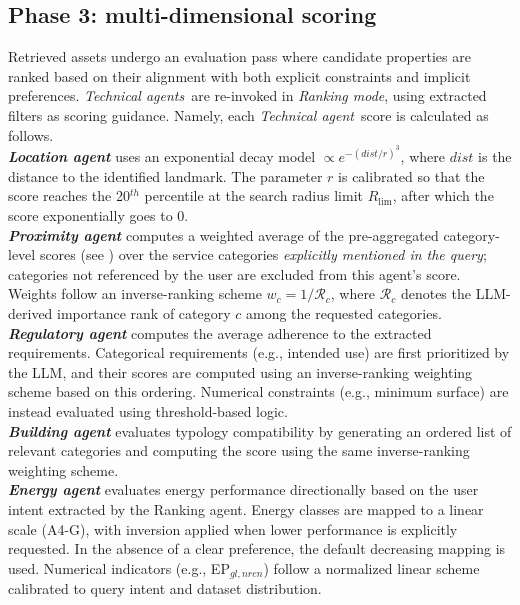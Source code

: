 \documentclass[runningheads,orivec]{llncs}
\newcommand{\technicalagent}{\textit{Technical agent}}
\newcommand{\technicalagents}{\textit{Technical agents}}
\newcommand{\locationagent}{\textit{Location agent}}
\newcommand{\energyagent}{\textit{Energy agent}}
\newcommand{\proximityagent}{\textit{Proximity agent}}
\newcommand{\regulatoryagent}{\textit{Regulatory agent}}
\newcommand{\buildingagent}{\textit{Building agent}}
\newcommand{\rankingmode}{\textit{Ranking mode}}
\begin{document}
\subsection{Phase 3: multi-dimensional scoring}
\label{sec:methods_phase3}
Retrieved assets undergo an evaluation pass where candidate properties are ranked based on their alignment with both explicit constraints and implicit preferences.
\technicalagents\ are re-invoked in \rankingmode, using extracted filters as scoring guidance.
Namely, each \technicalagent\ score is calculated as follows.
\\
\textbf{\locationagent} uses an exponential decay model $\propto e^{-(dist/r)^3}$, where $dist$ is the distance to the identified landmark. The parameter $r$ is calibrated so that the score reaches the 20$^{th}$ percentile at the search radius limit $R_\text{lim}$, after which the score exponentially goes to 0.
\\
\textbf{\proximityagent} computes a weighted average of the pre-aggregated 
category-level scores (see ) over the service categories 
\emph{explicitly mentioned in the query}; categories not referenced by the 
user are excluded from this agent's score. Weights follow an inverse-ranking 
scheme $w_c = 1 / \mathcal{R}_c$, where $\mathcal{R}_c$ denotes the 
LLM-derived importance rank of category $c$ among the requested categories.
\\
\textbf{\regulatoryagent} computes the average adherence to the extracted requirements. Categorical requirements (e.g., intended use) are first prioritized by the LLM, and their scores are computed using an inverse-ranking weighting scheme based on this ordering. Numerical constraints (e.g., minimum surface) are instead evaluated using threshold-based logic.
\\
\textbf{\buildingagent} evaluates typology compatibility by generating an ordered list of relevant categories and computing the score using the same inverse-ranking weighting scheme.
\\
\textbf{\energyagent} evaluates energy performance directionally based on the user intent extracted by the Ranking agent. Energy classes are mapped to a linear scale (A4-G), with inversion applied when lower performance is explicitly requested. In the absence of a clear preference, the default decreasing mapping is used. 
Numerical indicators (e.g., EP$_{gl,nren}$) follow a normalized linear
scheme calibrated to query intent and dataset distribution.
\end{document}
